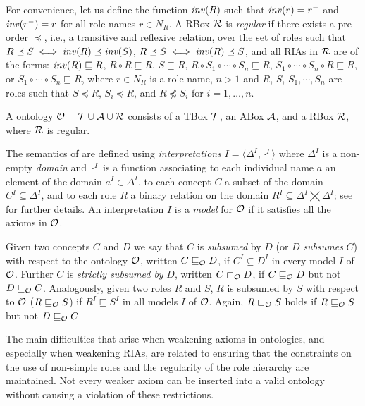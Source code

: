 \documentclass[
]{ceurart}
\begin{document}
For convenience, let us define the function $\mathit{inv}(R)$ such that $\mathit{inv}(r) = r^-$ and $\mathit{inv}(r^-) = r$ for all role names $r \in N_R$. A RBox $\mathcal{R}$ is \emph{regular} if there exists a pre-order $\preceq$, i.e., a transitive and reflexive relation, over the set of roles such that $R \preceq S \iff \mathit{inv}(R) \preceq \mathit{inv}(S)$, $R \preceq S \iff \mathit{inv}(R) \preceq S$, and all RIAs in $\mathcal{R}$ are of the forms:
$\mathit{inv}(R) \sqsubseteq R$,
$R \circ R \sqsubseteq R$,
$S \sqsubseteq R$, $R \circ S_1 \circ \cdots \circ S_n \sqsubseteq R$,
$S_1 \circ \cdots \circ S_n \circ R \sqsubseteq R$, or
$S_1 \circ \cdots \circ S_n \sqsubseteq R$,
where $r \in N_R$ is a role name, $n > 1$ and $R$, $S$, $S_1, \cdots, S_n$ are roles such that $S \preceq R$, $S_i \preceq R$, and $R \not\preceq S_i$ for $i = 1, \dots, n$.

A \SROIQ ontology $\mathcal{O} = \mathcal{T} \cup \mathcal{A} \cup \mathcal{R}$ consists of a TBox $\mathcal{T}$, an ABox $\mathcal{A}$, and a RBox $\mathcal{R}$, where $\mathcal{R}$ is regular.

The semantics of \SROIQ are defined using \emph{interpretations} $I = \langle \Delta^I, \cdot^I \rangle$ where $\Delta^I$ is a non-empty \emph{domain} and $\cdot^I$ is a function associating to each individual name $a$ an element of the domain $a^I \in \Delta^I$, to each concept $C$ a subset of the domain $C^I \subseteq \Delta^I$, and to each role $R$ a binary relation on the domain $R^I \subseteq \Delta^I \bigtimes \Delta^I$; see \cite{baader_horrocks_lutz_sattler_2017,HorrocksKutzSattlerKR2006} for further details. An interpretation $I$ is a \emph{model} for $\mathcal{O}$ if it satisfies all the axioms in $\mathcal{O}$.

Given two concepts $C$ and $D$ we say that $C$ is \emph{subsumed} by $D$ (or $D$ \emph{subsumes} $C$) with respect to the ontology $\mathcal{O}$, written $C \sqsubseteq_\mathcal{O} D$, if $C^I \subseteq D^I$ in every model $I$ of $\mathcal{O}$. Further $C$ is \emph{strictly subsumed by} $D$, written $C \sqsubset_\mathcal{O} D$, if $C \sqsubseteq_\mathcal{O} D$ but not $D \sqsubseteq_\mathcal{O} C$. Analogously, given two roles $R$ and $S$, $R$ is subsumed by $S$ with respect to $\mathcal{O}$ ($R \sqsubseteq_\mathcal{O} S$) if $R^I \sqsubseteq S^I$ in all models $I$ of $\mathcal{O}$. Again, $R \sqsubset_\mathcal{O} S$ holds if $R \sqsubseteq_\mathcal{O} S$ but not $D \sqsubseteq_\mathcal{O} C$

The main difficulties that arise when weakening axioms in \SROIQ ontologies, and especially when weakening RIAs, are related to ensuring that the constraints on the use of non-simple roles and the regularity of the role hierarchy are maintained. Not every weaker axiom can be inserted into a valid \SROIQ ontology without causing a violation of these restrictions.
\end{document}

